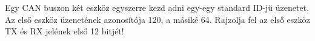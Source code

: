 \begin{example}

Egy CAN buszon két eszköz egyszerre kezd adni egy-egy standard ID-jű üzenetet. Az első eszköz üzenetének azonosítója 120, a másiké 64. Rajzolja fel az első eszköz TX és RX jelének első 12 bitjét!

\tcbline
\vspace{1mm}

\solution

\end{example}